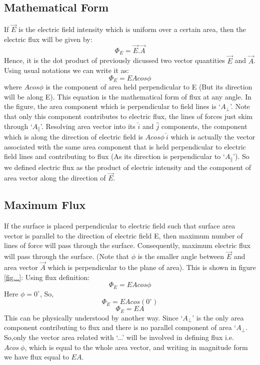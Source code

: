 \subsection*{Mathematical Form}
If $\vec{E}$ is the electric field intensity which is uniform over a certain area,
then the electric flux will be given by:
\begin{equation}\label{eq:11.17}
  \Phi_{E}  = \vec{E}.\vec{A}
\end{equation}
Hence, it is the dot product of previously dicussed two vector
quantities $\vec{E}$ and $\vec{A}$.
Using usual notations we can write it as:
\begin{equation}
  \Phi_{E} = EAcos\phi
\end{equation}
where $Acos\phi$ is the component of area held perpendicular to
E (But its direction will be along E).
This equation is the mathematical form of flux at any angle.
In the figure, the area component which is perpendicular
to field lines is  `$A_{\bot}$'. Note that only this component contributes
to electric flux, the lines of forces just skim through `$A_{\parallel}$'.
Resolving area vector into its $\hat{i}$ and $\hat{j}$ components,
the component which is along the direction of electric field is $Acos\phi\:\hat{i}$
which is actually the vector associated with the same area component
that is held perpendicular to electric field lines and contributing
to flux (As its direction is perpendicular to `$A_{\parallel}$').
So we defined electric flux as the product of electric
intensity and the component of area vector along the direction of $\vec{E}$.

\subsection*{Maximum Flux}
If the surface is placed perpendicular to electric field such
that surface area vector is parallel to the direction of electric field E,
then maximum number of lines of force will pass through the surface.
Consequently, maximum electric flux will pass through the surface.
(Note that $\phi$ is the smaller angle between $\vec{E}$ and area vector
$\vec{A}$ which is perpendicular to the plane of area).
This is shown in figure \ref{fig...}:
Using flux definition:
\begin{equation}
  \Phi_{E} = EAcos\phi \nonumber
\end{equation}
Here $\phi = 0^{\circ}$, So,
\begin{equation}
  \Phi_{E} = EAcos(0^{\circ}) \nonumber
\end{equation}
\begin{equation}
  \Phi_{E} = EA \nonumber
\end{equation}
This can be physically understood by another way.
Since `$A_{\bot}$' is the only area component contributing to flux and there
is no parallel component of area `$A_{\bot}$. So,only the vector area related with `...'
will be involved in defining flux i.e. $Acos\:\phi$, which is equal to the
whole area vector, and writing in magnitude form we have flux equal to $EA$.

